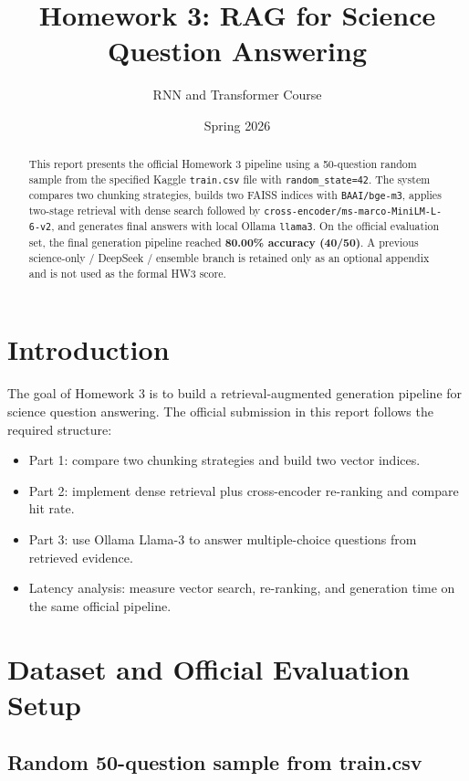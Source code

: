 \documentclass[12pt,a4paper]{article}
\title{Homework 3: RAG for Science Question Answering}
\author{RNN and Transformer Course}
\date{Spring 2026}
\begin{document}
\maketitle

\begin{abstract}
This report presents the official Homework 3 pipeline using a 50-question random sample from the specified Kaggle \texttt{train.csv} file with \texttt{random\_state=42}. The system compares two chunking strategies, builds two FAISS indices with \texttt{BAAI/bge-m3}, applies two-stage retrieval with dense search followed by \texttt{cross-encoder/ms-marco-MiniLM-L-6-v2}, and generates final answers with local Ollama \texttt{llama3}. On the official evaluation set, the final generation pipeline reached \textbf{80.00\% accuracy (40/50)}. A previous science-only / DeepSeek / ensemble branch is retained only as an optional appendix and is not used as the formal HW3 score.
\end{abstract}

\tableofcontents
\newpage

\section{Introduction}

The goal of Homework 3 is to build a retrieval-augmented generation pipeline for science question answering. The official submission in this report follows the required structure:

\begin{itemize}
    \item Part 1: compare two chunking strategies and build two vector indices.
    \item Part 2: implement dense retrieval plus cross-encoder re-ranking and compare hit rate.
    \item Part 3: use Ollama Llama-3 to answer multiple-choice questions from retrieved evidence.
    \item Latency analysis: measure vector search, re-ranking, and generation time on the same official pipeline.
\end{itemize}

\section{Dataset and Official Evaluation Setup}

\subsection{Random 50-question sample from train.csv}
\end{document}
